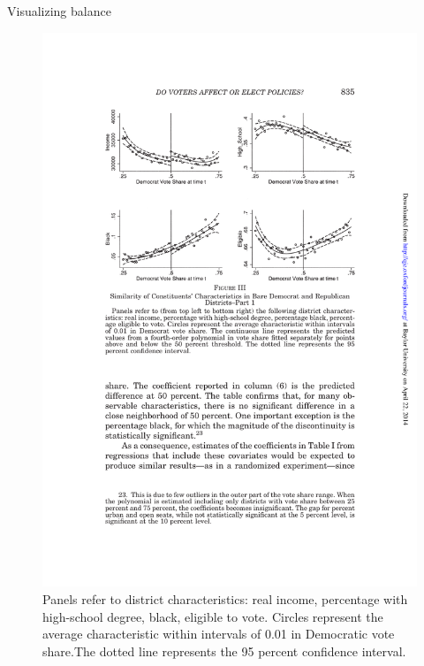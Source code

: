 \documentclass{beamer}
\begin{document}
\begin{frame}{Visualizing balance}
	\begin{figure}
	\includegraphics[scale=0.85]{./lecture_includes/lee_moretti_butler_fig3.pdf}
	\caption{\scriptsize Panels refer to district characteristics: real income, percentage with high-school degree, black, eligible to vote. Circles represent the average characteristic within intervals of 0.01 in Democratic vote share.The dotted line represents the 95 percent confidence interval.}
	\end{figure}
	
\end{frame}
\end{document}
